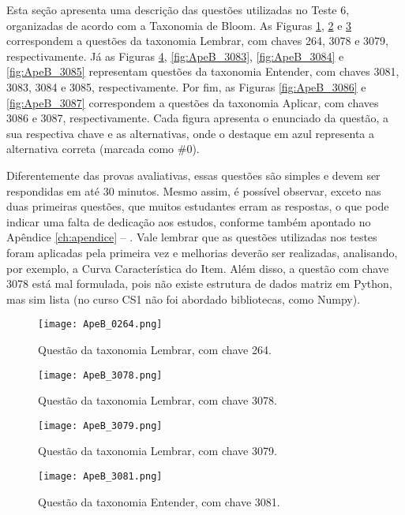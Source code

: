 Esta seção apresenta uma descrição das questões utilizadas no Teste 6, organizadas de acordo com a Taxonomia de Bloom. As Figuras \ref{fig:ApeB_0264}, \ref{fig:ApeB_3078} e \ref{fig:ApeB_3079} correspondem a questões da taxonomia Lembrar, com chaves 264, 3078 e 3079, respectivamente. Já as Figuras \ref{fig:ApeB_3081}, \ref{fig:ApeB_3083}, \ref{fig:ApeB_3084} e \ref{fig:ApeB_3085} representam questões da taxonomia Entender, com chaves 3081, 3083, 3084 e 3085, respectivamente. Por fim, as Figuras \ref{fig:ApeB_3086} e \ref{fig:ApeB_3087} correspondem a questões da taxonomia Aplicar, com chaves 3086 e 3087, respectivamente. Cada figura apresenta o enunciado da questão, a sua respectiva chave e as alternativas, onde o destaque em azul representa a alternativa correta (marcada como \#0). 

Diferentemente das provas avaliativas, essas questões são simples e devem ser respondidas em até 30 minutos. Mesmo assim, é possível observar, exceto nas duas primeiras questões, que muitos estudantes erram as respostas, o que pode indicar uma falta de dedicação aos estudos, conforme também apontado no Apêndice \ref{ch:apendice} -- . Vale lembrar que as questões utilizadas nos testes foram aplicadas pela primeira vez e melhorias deverão ser realizadas, analisando, por exemplo, a Curva Característica do Item. Além disso, a questão com chave 3078 está mal formulada, pois não existe estrutura de dados matriz em Python, mas sim lista (no curso CS1 não foi abordado bibliotecas, como Numpy).

\begin{figure}[!ht]
    \centering
    \texttt{[image: ApeB\_0264.png]}
     \caption{Questão da taxonomia Lembrar, com chave 264.}
  \label{fig:ApeB_0264}
\end{figure}

\begin{figure}[!ht]
    \centering
    \texttt{[image: ApeB\_3078.png]}
     \caption{Questão da taxonomia Lembrar, com chave 3078.}
  \label{fig:ApeB_3078}
\end{figure}

\begin{figure}[!ht]
    \centering
    \texttt{[image: ApeB\_3079.png]}
     \caption{Questão da taxonomia Lembrar, com chave 3079.}
  \label{fig:ApeB_3079}
\end{figure}

\begin{figure}[!ht]
    \centering
    \texttt{[image: ApeB\_3081.png]}
     \caption{Questão da taxonomia Entender, com chave 3081.}
  \label{fig:ApeB_3081}
\end{figure}

